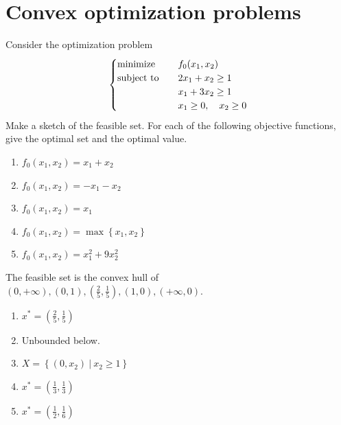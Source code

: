 \section{Convex optimization problems}
\begin{problem}[4.1]
    Consider the optimization problem\[\begin{cases}
        \operatorname{minimize} \quad &f_0(x_1, x_2)\\
        \operatorname{subject\ to} \quad &2x_1 + x_2 \ge 1\\
        &x_1 + 3x_2 \ge 1\\
        &x_1 \ge 0, \quad x_2 \ge 0
    \end{cases}\]
    Make a sketch of the feasible set. For each of the following objective functions, give the optimal set and the optimal value.
    \begin{enumerate}
        \item $f_0(x_1, x_2) = x_1 + x_2$
        \item $f_0(x_1, x_2) = -x_1 - x_2$
        \item $f_0(x_1, x_2) = x_1$
        \item $f_0(x_1, x_2) = \max\left\{x_1, x_2\right\}$
        \item $f_0(x_1, x_2) = x_1^2 + 9x_2^2$
    \end{enumerate}

    \Answer The feasible set is the convex hull of $(0, +\infty), (0, 1), (\frac{2}{5}, \frac{1}{5}), (1, 0), (+\infty, 0)$.
    \begin{enumerate}
        \item $x^* = (\frac{2}{5}, \frac{1}{5})$
        \item Unbounded below.
        \item $X = \left\{(0, x_2)\ |\ x_2 \ge 1\right\}$
        \item $x^* = (\frac{1}{3}, \frac{1}{3})$
        \item $x^* = (\frac{1}{2}, \frac{1}{6})$
    \end{enumerate}
\end{problem}

